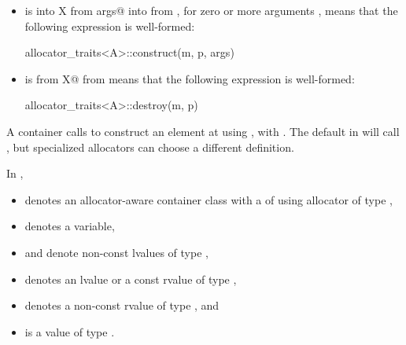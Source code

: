 \begin{itemize}
\item
{} is
{ into X from args@ into  from },
for zero
or more arguments , means that the following expression is well-formed:
\begin{codeblock}
allocator_traits<A>::construct(m, p, args)
\end{codeblock}

\item
{} is
{ from X@ from }
means that the following expression is well-formed:
\begin{codeblock}
allocator_traits<A>::destroy(m, p)
\end{codeblock}
\end{itemize}

\begin{note}
A container calls 
to construct an element at  using ,
with .
The default  in  will
call ,
but specialized allocators can choose a different definition.
\end{note}

\pnum
In ,
\begin{itemize}
\item
{} denotes an allocator-aware container class
with a  of  using allocator of type ,
\item
{} denotes a variable,
\item
{} and  denote non-const lvalues of type ,
\item
{} denotes an lvalue or a const rvalue of type ,
\item
{} denotes a non-const rvalue of type , and
\item
{} is a value of type .
\end{itemize}

